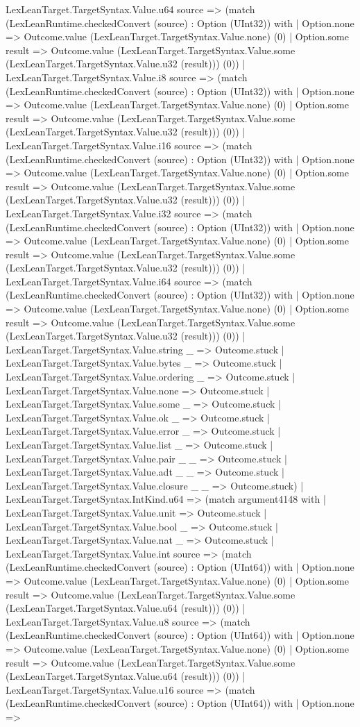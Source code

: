 \documentclass[11pt]{article}
\begin{document}
LexLeanTarget.TargetSyntax.Value.u64 source => (match (LexLeanRuntime.checkedConvert (source) : Option (UInt32)) with | Option.none => Outcome.value (LexLeanTarget.TargetSyntax.Value.none) (0) | Option.some result => Outcome.value (LexLeanTarget.TargetSyntax.Value.some (LexLeanTarget.TargetSyntax.Value.u32 (result))) (0)) | LexLeanTarget.TargetSyntax.Value.i8 source => (match (LexLeanRuntime.checkedConvert (source) : Option (UInt32)) with | Option.none => Outcome.value (LexLeanTarget.TargetSyntax.Value.none) (0) | Option.some result => Outcome.value (LexLeanTarget.TargetSyntax.Value.some (LexLeanTarget.TargetSyntax.Value.u32 (result))) (0)) | LexLeanTarget.TargetSyntax.Value.i16 source => (match (LexLeanRuntime.checkedConvert (source) : Option (UInt32)) with | Option.none => Outcome.value (LexLeanTarget.TargetSyntax.Value.none) (0) | Option.some result => Outcome.value (LexLeanTarget.TargetSyntax.Value.some (LexLeanTarget.TargetSyntax.Value.u32 (result))) (0)) | LexLeanTarget.TargetSyntax.Value.i32 source => (match (LexLeanRuntime.checkedConvert (source) : Option (UInt32)) with | Option.none => Outcome.value (LexLeanTarget.TargetSyntax.Value.none) (0) | Option.some result => Outcome.value (LexLeanTarget.TargetSyntax.Value.some (LexLeanTarget.TargetSyntax.Value.u32 (result))) (0)) | LexLeanTarget.TargetSyntax.Value.i64 source => (match (LexLeanRuntime.checkedConvert (source) : Option (UInt32)) with | Option.none => Outcome.value (LexLeanTarget.TargetSyntax.Value.none) (0) | Option.some result => Outcome.value (LexLeanTarget.TargetSyntax.Value.some (LexLeanTarget.TargetSyntax.Value.u32 (result))) (0)) | LexLeanTarget.TargetSyntax.Value.string \_ => Outcome.stuck | LexLeanTarget.TargetSyntax.Value.bytes \_ => Outcome.stuck | LexLeanTarget.TargetSyntax.Value.ordering \_ => Outcome.stuck | LexLeanTarget.TargetSyntax.Value.none => Outcome.stuck | LexLeanTarget.TargetSyntax.Value.some \_ => Outcome.stuck | LexLeanTarget.TargetSyntax.Value.ok \_ => Outcome.stuck | LexLeanTarget.TargetSyntax.Value.error \_ => Outcome.stuck | LexLeanTarget.TargetSyntax.Value.list \_ => Outcome.stuck | LexLeanTarget.TargetSyntax.Value.pair \_ \_ => Outcome.stuck | LexLeanTarget.TargetSyntax.Value.adt \_ \_ => Outcome.stuck | LexLeanTarget.TargetSyntax.Value.closure \_ \_ => Outcome.stuck) | LexLeanTarget.TargetSyntax.IntKind.u64 => (match argument4148 with | LexLeanTarget.TargetSyntax.Value.unit => Outcome.stuck | LexLeanTarget.TargetSyntax.Value.bool \_ => Outcome.stuck | LexLeanTarget.TargetSyntax.Value.nat \_ => Outcome.stuck | LexLeanTarget.TargetSyntax.Value.int source => (match (LexLeanRuntime.checkedConvert (source) : Option (UInt64)) with | Option.none => Outcome.value (LexLeanTarget.TargetSyntax.Value.none) (0) | Option.some result => Outcome.value (LexLeanTarget.TargetSyntax.Value.some (LexLeanTarget.TargetSyntax.Value.u64 (result))) (0)) | LexLeanTarget.TargetSyntax.Value.u8 source => (match (LexLeanRuntime.checkedConvert (source) : Option (UInt64)) with | Option.none => Outcome.value (LexLeanTarget.TargetSyntax.Value.none) (0) | Option.some result => Outcome.value (LexLeanTarget.TargetSyntax.Value.some (LexLeanTarget.TargetSyntax.Value.u64 (result))) (0)) | LexLeanTarget.TargetSyntax.Value.u16 source => (match (LexLeanRuntime.checkedConvert (source) : Option (UInt64)) with | Option.none => 
\end{document}
